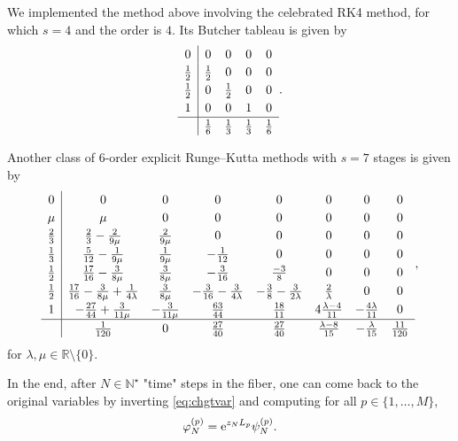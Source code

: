 \documentclass[11pt]{amsart}
\newcommand{\R}{{\mathbb R}}
\newcommand{\N}{{\mathbb N}}
\begin{document}
We implemented the method above involving the celebrated RK4 method, for which $s=4$ and the order is $4$. Its Butcher tableau is given by
\begin{equation*}
  \renewcommand\arraystretch{1.2}
  \begin{array}
  {c|cccc}
    0 & 0 & 0 & 0 & 0\\
    \frac{1}{2} &  \frac{1}{2} & 0 & 0 & 0\\
    \frac{1}{2} & 0 & \frac12 & 0 & 0\\
    1 & 0 & 0 & 1 & 0  \\
    \hline
    & \frac{1}{6} & \frac{1}{3} & \frac13 & \frac16
  \end{array}.
\end{equation*}

Another class of $6$-order explicit Runge--Kutta methods with $s=7$ stages is given \cite{Butcher64} by
\begin{equation*}
  \begin{array}{c|ccccccc}
    0 & 0 & 0 & 0 & 0 & 0 & 0 & 0 \\
    \mu & \mu & 0 & 0 & 0 & 0 & 0 & 0 \\
    \frac23 & \frac23-\frac{2}{9\mu} & \frac{2}{9\mu} & 0 & 0 & 0 & 0 & 0 \\
    \frac13 & \frac{5}{12}-\frac{1}{9\mu} & \frac{1}{9\mu} & -\frac{1}{12}  & 0 & 0 & 0 & 0\\
    \frac12 & \frac{17}{16}-\frac{3}{8\mu} & \frac{3}{8\mu} & -\frac{3}{16} & \frac{-3}{8} & 0 & 0 & 0\\
    \frac12 & \frac{17}{16}-\frac{3}{8\mu} + \frac{1}{4\lambda} & \frac{3}{8\mu} & - \frac{3}{16} - \frac{3}{4\lambda} & -\frac{3}{8}-\frac{3}{2\lambda} & \frac{2}{\lambda} & 0 & 0\\
    1 & -\frac{27}{44} + \frac{3}{11\mu} & -\frac{3}{11\mu} & \frac{63}{44} & \frac{18}{11} & 4\frac{\lambda-4}{11} & -\frac{4\lambda}{11} & 0 \\
    \hline
    & \frac{1}{120} & 0 & \frac{27}{40} & \frac{27}{40} & \frac{\lambda-8}{15} & -\frac{\lambda}{15} & \frac{11}{120}
  \end{array},
\end{equation*}
for $\lambda,\mu\in\R\setminus\{0\}$.

In the end, after $N\in\N^\star$ "time" steps in the fiber,
one can come back to the original variables by inverting \eqref{eq:chgtvar} and computing for all $p\in\{1,\dots,M\}$,
\begin{equation*}
  \varphi_N^{(p)} = {\rm e}^{z_N L_p} \psi_N^{(p)}.
\end{equation*}
\end{document}
